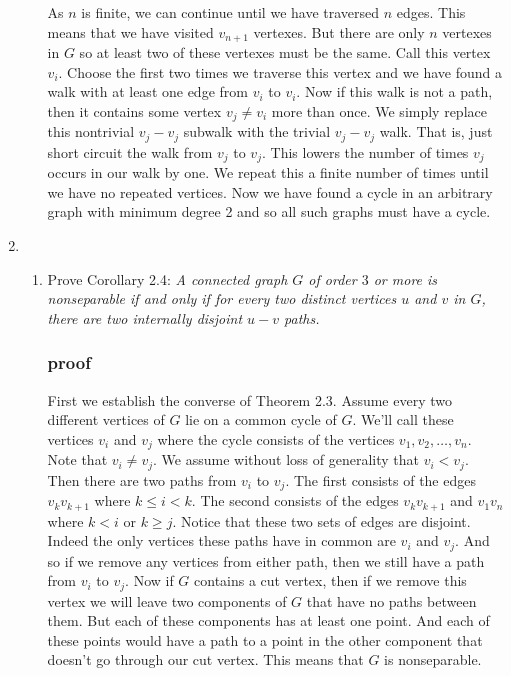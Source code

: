 \documentclass[letterpaper]{article}
\begin{document}
\begin{enumerate}
\begin{enumerate}
  As $n$ is finite, we can continue until we have traversed $n$ edges.
  This means that we have visited $v_{n+1}$ vertexes. But there are only $n$ vertexes in $G$ so at least two of these vertexes must be the same. Call this vertex $v_i$. Choose the first two times we traverse this vertex and we have found a walk with at least one edge from $v_i$ to $v_i$.
  Now if this walk is not a path, then it contains some vertex $v_j\ne v_i$ more than once. We simply replace this nontrivial $v_j-v_j$ subwalk with the trivial $v_j-v_j$ walk. That is, just short circuit the walk from $v_j$ to $v_j$. This lowers the number of times $v_j$ occurs in our walk by one. We repeat this a finite number of times until we have no repeated vertices. Now we have found a cycle in an arbitrary graph with minimum degree 2 and so all such graphs must have a cycle.
  \end{enumerate}
\renewcommand{\labelenumi}{2.\arabic{enumi}}
\setcounter{enumi}{0}
\item
  \begin{enumerate}
  \item
  Prove Corollary 2.4: {\it A connected graph  $G$ of order $3$ or more is nonseparable if and only if for every two distinct vertices $u$ and $v$ in $G$, there are two internally disjoint $u-v$ paths.}
  \subsubsection*{proof}

  First we establish the converse of Theorem 2.3. Assume every two different vertices of $G$ lie on a common cycle of $G$. We'll call these vertices $v_i$ and $v_j$ where the cycle consists of the vertices $v_1,v_2,\dots,v_n$. Note that $v_i\ne v_j$. We assume without loss of generality that $v_i<v_j$. Then there are two paths from $v_i$ to $v_j$. The first consists of the edges $v_kv_{k+1}$ where $k\le i<k$. The second consists of the edges $v_kv_{k+1}$ and $v_1v_n$ where $k<i$ or $k\ge j$. Notice that these two sets of edges are disjoint. Indeed the only vertices these paths have in common are $v_i$ and $v_j$. And so if we remove any vertices from either path, then we still have a path from $v_i$ to $v_j$. Now if $G$ contains a cut vertex, then if we remove this vertex we will leave two components of $G$ that have no paths between them. But each of these components has at least one point. And each of these points would have a path to a point in the other component that doesn't go through our cut vertex. This means that $G$ is nonseparable.


\end{enumerate}
\end{enumerate}
\end{document}
